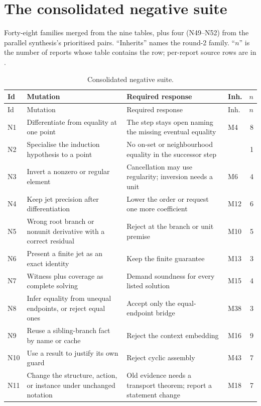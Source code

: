 \section{The consolidated negative suite}\label{app:suite}
Forty-eight families merged from the nine tables, plus four (N49--N52) from the parallel synthesis's prioritised pairs. ``Inherits'' names the round-2 family. ``$n$'' is the number of reports whose table contains the row; per-report source rows are in .

{\small
\begin{longtable}{@{}L{8mm}L{56mm}L{60mm}L{9mm}r@{}}
\caption{Consolidated negative suite.}\label{tab:suite}\\
\toprule
Id & Mutation & Required response & Inh. & $n$\\
\midrule\endfirsthead
\toprule
Id & Mutation & Required response & Inh. & $n$\\
\midrule\endhead
\bottomrule\endfoot
N1 & Differentiate from equality at one point & The step stays open naming the missing eventual equality & M4 & 8\\
N2 & Specialise the induction hypothesis to a point & No on-set or neighbourhood equality in the successor step & & 1\\
N3 & Invert a nonzero or regular element & Cancellation may use regularity; inversion needs a unit & M6 & 4\\
N4 & Keep jet precision after differentiation & Lower the order or request one more coefficient & M12 & 6\\
N5 & Wrong root branch or nonunit derivative with a correct residual & Reject at the branch or unit premise & M10 & 5\\
N6 & Present a finite jet as an exact identity & Keep the finite guarantee & M13 & 3\\
N7 & Witness plus coverage as complete solving & Demand soundness for every listed solution & M15 & 4\\
N8 & Infer equality from unequal endpoints, or reject equal ones & Accept only the equal-endpoint bridge & M38 & 3\\
N9 & Reuse a sibling-branch fact by name or cache & Reject the context embedding & M16 & 9\\
N10 & Use a result to justify its own guard & Reject cyclic assembly & M43 & 7\\
N11 & Change the structure, action, or instance under unchanged notation & Old evidence needs a transport theorem; report a statement change & M18 & 7\\

\end{longtable}}
